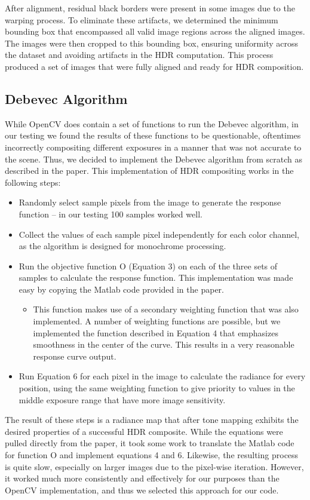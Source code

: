 \documentclass[
	a4paper, %
	10pt, %
	unnumberedsections, %
	twoside, %
]{LTJournalArticle}
\begin{document}
After alignment, residual black borders were present in some images due to the warping process. To eliminate these artifacts, we determined the minimum bounding box that encompassed all valid image regions across the aligned images. The images were then cropped to this bounding box, ensuring uniformity across the dataset and avoiding artifacts in the HDR computation. This process produced a set of images that were fully aligned and ready for HDR composition.

\subsection{Debevec Algorithm}
While OpenCV does contain a set of functions to run the Debevec algorithm, in our testing we found the results of these functions to be questionable, oftentimes incorrectly compositing different exposures in a manner that was not accurate to the scene. Thus, we decided to implement the Debevec algorithm from scratch as described in the paper. This implementation of HDR compositing works in the following steps:
\begin{itemize}
	\item Randomly select sample pixels from the image to generate the response function – in our testing 100 samples worked well.
	\item Collect the values of each sample pixel independently for each color channel, as the algorithm is designed for monochrome processing.
	\item Run the objective function O (Equation 3) on each of the three sets of samples to calculate the response function. This implementation was made easy by copying the Matlab code provided in the paper.
	\begin{itemize}
		\item This function makes use of a secondary weighting function that was also implemented. A number of weighting functions are possible, but we implemented the function described in Equation 4 that emphasizes smoothness in the center of the curve. This results in a very reasonable response curve output.
	\end{itemize}
	\item Run Equation 6 for each pixel in the image to calculate the radiance for every position, using the same weighting function to give priority to values in the middle exposure range that have more image sensitivity.
\end{itemize}
The result of these steps is a radiance map that after tone mapping exhibits the desired properties of a successful HDR composite. While the equations were pulled directly from the paper, it took some work to translate the Matlab code for function O and implement equations 4 and 6. Likewise, the resulting process is quite slow, especially on larger images due to the pixel-wise iteration. However, it worked much more consistently and effectively for our purposes than the OpenCV implementation, and thus we selected this approach for our code.
\end{document}
